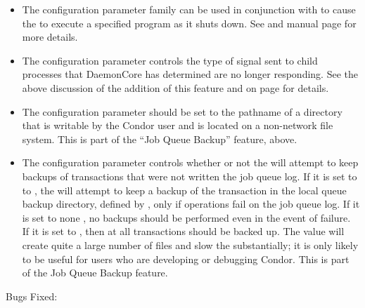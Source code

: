 \begin{itemize}
\item The configuration parameter family
   can be used in conjunction
  with  to cause the  to execute
  a specified program as it shuts down.  See
  \pageref{param:MasterShutdownProgram} and 
  manual page for more details.

\item The configuration parameter
   controls the type of signal
  sent to child processes that DaemonCore has determined are no longer
  responding.  See the above discussion of the addition of this
  feature and  on page
  \pageref{param:NotRespondingWantCore} for details.

\item The configuration parameter 
  should be set to the pathname of a directory that is writable by
  the Condor user and is located on a non-network file system.
  This is part of the ``Job Queue Backup'' feature, above.

\item The configuration parameter
   controls whether or not the
   will attempt to keep backups of transactions that
  were not written the job queue log.  If it is set to to
  , the  will attempt to keep a backup
  of the transaction in the local queue backup directory,
  defined by ,
  only if operations fail on the job queue log.  If it is set
  to none , no backups should be performed even in the
  event of failure.  If it is set to , then at all
  transactions should be backed up.  The  value will
  create quite a large number of files and slow the 
  substantially; it is only likely to be useful for users who are
  developing or debugging Condor.
  This is part of the Job Queue Backup feature.

\end{itemize}

\noindent Bugs Fixed:

